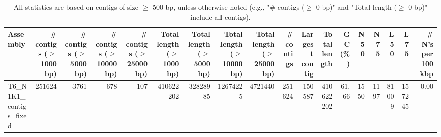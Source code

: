\documentclass[12pt,a4paper]{article}
\begin{document}
\begin{table}[ht]
\begin{center}
\caption{All statistics are based on contigs of size $\geq$ 500 bp, unless otherwise noted (e.g., "\# contigs ($\geq$ 0 bp)" and "Total length ($\geq$ 0 bp)" include all contigs).}
\begin{tabular}{|l*{17}{|r}|}
\hline
Assembly & \# contigs ($\geq$ 1000 bp) & \# contigs ($\geq$ 5000 bp) & \# contigs ($\geq$ 10000 bp) & \# contigs ($\geq$ 25000 bp) & Total length ($\geq$ 1000 bp) & Total length ($\geq$ 5000 bp) & Total length ($\geq$ 10000 bp) & Total length ($\geq$ 25000 bp) & \# contigs & Largest contig & Total length & GC (\%) & N50 & N75 & L50 & L75 & \# N's per 100 kbp \\ \hline
T6\_N1K1\_contigs\_fixed & 251624 & 3761 & 678 & 107 & 410622202 & 32828985 & 12674225 & 4721440 & 251624 & 150587 & 410622202 & 61.66 & 1550 & 1197 & 81009 & 157245 & 0.00 \\ \hline
\end{tabular}
\end{center}
\end{table}
\end{document}
